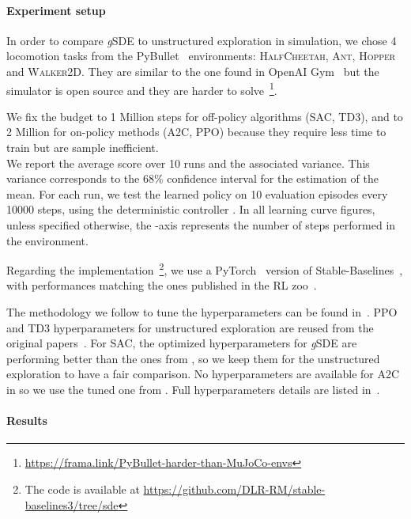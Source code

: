 \documentclass{article}
\newcommand{\ourSDE}{\textit{g}\textsc{SDE}\xspace}
\newcommand{\aac}{\textsc{A2C}\xspace}
\newcommand{\ppo}{\textsc{PPO}\xspace}
\newcommand{\sac}{\textsc{SAC}\xspace}
\newcommand{\tddd}{\textsc{TD3}\xspace}
\newcommand{\hc}{\textsc{HalfCheetah}\xspace}
\newcommand{\hopper}{\textsc{Hopper}\xspace}
\newcommand{\ant}{\textsc{Ant}\xspace}
\newcommand{\walker}{\textsc{Walker2D}\xspace}
\begin{document}
\paragraph{Experiment setup}

In order to compare \ourSDE to unstructured exploration in simulation, we chose 4 locomotion tasks from the PyBullet~\citep{coumans2019bullet} environments: \hc, \ant, \hopper and \walker. They are similar to the one found in OpenAI Gym~\cite{brockman2016openai} but the simulator is open source and they are harder to solve~\footnote{\url{https://frama.link/PyBullet-harder-than-MuJoCo-envs}}.

We fix the budget to 1 Million steps for off-policy algorithms (\sac, \tddd), and to 2 Million for on-policy methods (\aac, \ppo) because they require less time to train but are sample inefficient.\\
We report the average score over 10 runs and the associated variance. This variance corresponds to the 68\% confidence interval for the estimation of the mean.
For each run, we test the learned policy on 10 evaluation episodes every 10000 steps, using the deterministic controller . In all learning curve figures, unless specified otherwise, the -axis represents the number of steps performed in the environment.

Regarding the implementation~\footnote{The code is available at \url{https://github.com/DLR-RM/stable-baselines3/tree/sde}}, we use a PyTorch~\citep{raffin2019baselines3} version of Stable-Baselines~\citep{hill2018stable}, with performances matching the ones published in the RL zoo~\citep{raffin2018zoo}.

The methodology we follow to tune the hyperparameters can be found in~. \ppo and \tddd hyperparameters for unstructured exploration are reused from the original papers~\citep{schulman2017proximal, fujimoto2018addressing}. For \sac, the optimized hyperparameters for \ourSDE are performing better than the ones from \citet{haarnoja2018soft}, so we keep them for the unstructured exploration to have a fair comparison. No hyperparameters are available for \aac in \citet{mnih2016asynchronous} so we use the tuned one from \citet{raffin2018zoo}. Full hyperparameters details are listed in~.


\paragraph{Results}
\end{document}

